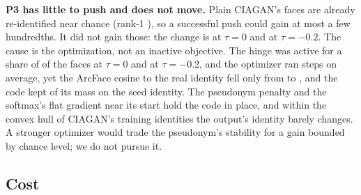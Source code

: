 \textbf{P3 has little to push and does not move.} Plain CIAGAN's faces are already
re-identified near chance (rank-1 ), so
a successful push could gain at most a few hundredths. It did not gain those:
the change is  at $\tau = 0$ and
 at $\tau = -0.2$. The cause is
the optimization, not an inactive objective. The hinge was active for a share
of  of the faces at $\tau = 0$ and
 at $\tau = -0.2$, and the optimizer
ran  steps on average, yet the ArcFace
cosine to the real identity fell only from 
to , and the code kept
 of its mass on the seed identity.
The pseudonym penalty and the softmax's flat gradient near its start hold the
code in place, and within the convex hull of CIAGAN's training identities the
output's identity barely changes. A stronger optimizer would trade the
pseudonym's stability for a gain bounded by chance level; we do not pursue it.

\subsection{Cost}
\label{sec:cost}

\begin{table}[ht]\centering
\caption{E5, cost of the final pipeline: share of detector faces generated, ms
per detector face (steady state), its main stages per generated face
(head segmentation, GFPGAN, swap, landmarking), speed-up against \emph{ref} on the
videos both ran, and GPU hours per hour of class (30\,fps, 20 faces per frame).
\emph{ref-cpu} ran on demo1 and demo2 only.}
\label{tab:e5-cost}

\end{table}

\begin{table}[ht]\centering
\caption{E5, what the viewer sees: privacy, utility and motion scored on the
composed video itself (reused faces as shown). Hidden: share of faces shown as
the neutral fill. \emph{ref-cpu}'s pooled values cover two videos; compare it in
Table~\ref{tab:e5-paired}.}
\label{tab:e5-video}

\end{table}

\begin{table}[ht]\centering
\caption{E5, each arm minus \emph{ref} on the same faces; * marks a 95\% track
bootstrap interval that excludes zero.}
\label{tab:e5-paired}

\end{table}

